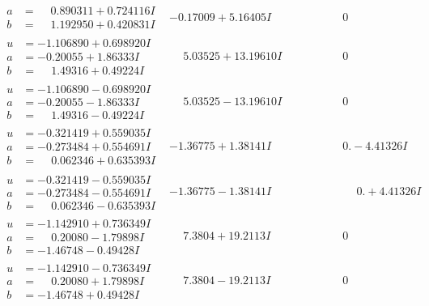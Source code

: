 \documentclass[1p]{elsarticle_modified}
\theoremstyle{definition}
\begin{document}
$$\begin{array}{c|c|c}
\begin{aligned}
a &= \phantom{-}0.890311 + 0.724116 I \\
b &= \phantom{-}1.192950 + 0.420831 I\end{aligned}
 & -0.17009 + 5.16405 I & \phantom{-0.000000 } 0 \\ \hline\begin{aligned}
u &= -1.106890 + 0.698920 I \\
a &= -0.20055 + 1.86333 I \\
b &= \phantom{-}1.49316 + 0.49224 I\end{aligned}
 & \phantom{-}5.03525 + 13.19610 I & \phantom{-0.000000 } 0 \\ \hline\begin{aligned}
u &= -1.106890 - 0.698920 I \\
a &= -0.20055 - 1.86333 I \\
b &= \phantom{-}1.49316 - 0.49224 I\end{aligned}
 & \phantom{-}5.03525 - 13.19610 I & \phantom{-0.000000 } 0 \\ \hline\begin{aligned}
u &= -0.321419 + 0.559035 I \\
a &= -0.273484 + 0.554691 I \\
b &= \phantom{-}0.062346 + 0.635393 I\end{aligned}
 & -1.36775 + 1.38141 I & \phantom{-0.000000 } 0. - 4.41326 I \\ \hline\begin{aligned}
u &= -0.321419 - 0.559035 I \\
a &= -0.273484 - 0.554691 I \\
b &= \phantom{-}0.062346 - 0.635393 I\end{aligned}
 & -1.36775 - 1.38141 I & \phantom{-0.000000 -}0. + 4.41326 I \\ \hline\begin{aligned}
u &= -1.142910 + 0.736349 I \\
a &= \phantom{-}0.20080 - 1.79898 I \\
b &= -1.46748 - 0.49428 I\end{aligned}
 & \phantom{-}7.3804 + 19.2113 I & \phantom{-0.000000 } 0 \\ \hline\begin{aligned}
u &= -1.142910 - 0.736349 I \\
a &= \phantom{-}0.20080 + 1.79898 I \\
b &= -1.46748 + 0.49428 I\end{aligned}
 & \phantom{-}7.3804 - 19.2113 I & \phantom{-0.000000 } 0 \\ \hline\begin{aligned}

\end{aligned}
\end{array}$$
\end{document}
